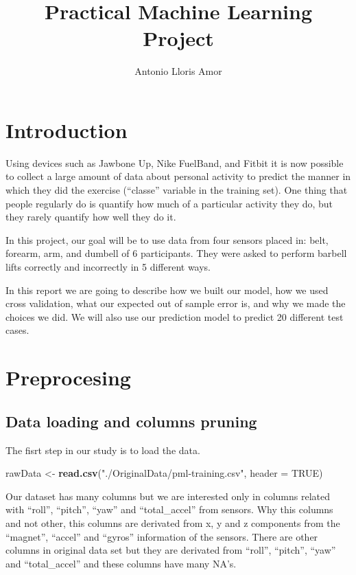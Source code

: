 \documentclass[]{article}
\title{Practical Machine Learning Project}
\author{Antonio Lloris Amor}
\date{}
\newenvironment{Shaded}{\begin{snugshade}}{\end{snugshade}}
\newcommand{\KeywordTok}[1]{\textcolor[rgb]{0.13,0.29,0.53}{\textbf{{#1}}}}
\newcommand{\DataTypeTok}[1]{\textcolor[rgb]{0.13,0.29,0.53}{{#1}}}
\newcommand{\StringTok}[1]{\textcolor[rgb]{0.31,0.60,0.02}{{#1}}}
\newcommand{\OtherTok}[1]{\textcolor[rgb]{0.56,0.35,0.01}{{#1}}}
\newcommand{\NormalTok}[1]{{#1}}
\begin{document}
\maketitle


\section{Introduction}\label{introduction}

Using devices such as Jawbone Up, Nike FuelBand, and Fitbit it is now
possible to collect a large amount of data about personal activity to
predict the manner in which they did the exercise (``classe'' variable
in the training set). One thing that people regularly do is quantify how
much of a particular activity they do, but they rarely quantify how well
they do it.

In this project, our goal will be to use data from four sensors placed
in: belt, forearm, arm, and dumbell of 6 participants. They were asked
to perform barbell lifts correctly and incorrectly in 5 different ways.

In this report we are going to describe how we built our model, how we
used cross validation, what our expected out of sample error is, and why
we made the choices we did. We will also use our prediction model to
predict 20 different test cases.

\section{Preprocesing}\label{preprocesing}

\subsection{Data loading and columns
pruning}\label{data-loading-and-columns-pruning}

The fisrt step in our study is to load the data.

\begin{Shaded}
\begin{Highlighting}[]
\NormalTok{rawData <-}\StringTok{ }\KeywordTok{read.csv}\NormalTok{(}\StringTok{"./OriginalData/pml-training.csv"}\NormalTok{, }\DataTypeTok{header =} \OtherTok{TRUE}\NormalTok{)}
\end{Highlighting}
\end{Shaded}

Our dataset has many columns but we are interested only in columns
related with ``roll'', ``pitch'', ``yaw'' and ``total\_accel'' from
sensors. Why this columns and not other, this columns are derivated from
x, y and z components from the ``magnet'', ``accel'' and ``gyros''
information of the sensors. There are other columns in original data set
but they are derivated from ``roll'', ``pitch'', ``yaw'' and
``total\_accel'' and these columns have many NA's.
\end{document}
